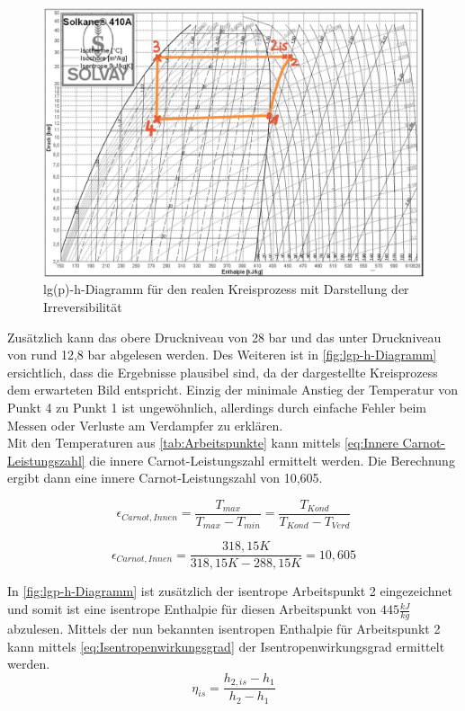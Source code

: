     \begin{figure}[!ht]
        \centering
        \includegraphics[width=\textwidth]{Abbildungen/lgp-h-diagramm.jpg}
        \caption{lg(p)-h-Diagramm für den realen Kreisprozess mit Darstellung der Irreversibilität}
        \label{fig:lgp-h-Diagramm}
    \end{figure}


    Zusätzlich kann das obere Druckniveau von 28 bar und das unter Druckniveau von rund 12,8 bar abgelesen werden.
    Des Weiteren ist in \autoref{fig:lgp-h-Diagramm} ersichtlich, dass die Ergebnisse plausibel sind, da der dargestellte Kreisprozess dem erwarteten Bild entspricht. Einzig der minimale Anstieg der Temperatur von Punkt 4 zu Punkt 1 ist ungewöhnlich, allerdings durch einfache Fehler beim Messen oder Verluste am Verdampfer zu erklären.\\

Mit den Temperaturen aus \autoref{tab:Arbeitspunkte} kann mittels \autoref{eq:Innere Carnot-Leistungszahl} die innere Carnot-Leistungszahl
ermittelt werden. Die Berechnung ergibt dann eine innere Carnot-Leistungszahl von 10,605.

    \begin{equation}
        \epsilon_{Carnot, Innen}=\frac{T_{max}}{T_{max}-T_{min}}=\frac{T_{Kond}}{T_{Kond}-T_{Verd}}
        \label{eq:Innere Carnot-Leistungszahl}
    \end{equation}

$$\epsilon_{Carnot, Innen}=\frac{318,15 K}{318,15 K-288,15 K}=10,605$$

 In \autoref{fig:lgp-h-Diagramm} ist zusätzlich der isentrope Arbeitspunkt 2 eingezeichnet und somit ist eine isentrope Enthalpie für diesen Arbeitspunkt von $445 \frac{kJ}{kg}$abzulesen.
Mittels der nun bekannten isentropen Enthalpie für Arbeitspunkt 2 kann mittels \autoref{eq:Isentropenwirkungsgrad} der Isentropenwirkungsgrad ermittelt werden.
\begin{equation}
    \eta_{is}=\frac{h_{2,is}-h_{1}}{h_{2}-h_{1}}
    \label{eq:Isentropenwirkungsgrad}
\end{equation}

